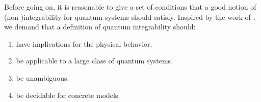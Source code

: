 \documentclass[a4paper,12pt,listof=totoc,index=totoc,bibliography=totoc,headsepline=false,headings=normal,BCOR16.153846mm,DIV12,headinclude,twoside,cleardoublepage=empty,numbers=noenddot,final]{scrreprt}
\theoremstyle{mystyle}
\numberwithin{equation}{section}
\numberwithin{figure}{section}
\numberwithin{lemma}{section}
\numberwithin{theorem}{section}
\numberwithin{corollary}{section}
\numberwithin{definition}{section}
\numberwithin{conjecture}{section}
\numberwithin{observation}{section}
\newcommand{\+}{\mkern2mu}
\DeclareMathOperator{\1}{\mathds{1}}
\begin{document}
Before going on, it is reasonable to give a set of conditions that a good notion of \mbox{(non-)}integrability for quantum systems should satisfy.
Inspired by the work of \textcite{1012.3587v1}, we demand that a definition of quantum integrability should:
\begin{enumerate}[label={(Condition~\arabic*)},ref={\arabic*},leftmargin=*]
\item \label{item:reasonablenotionofquantumintegrabilitycondition4} have implications for the physical behavior.
\item \label{item:reasonablenotionofquantumintegrabilitycondition1} be applicable to a large class of quantum systems.
\item \label{item:reasonablenotionofquantumintegrabilitycondition2} be unambiguous.
\item \label{item:reasonablenotionofquantumintegrabilitycondition3} be decidable for concrete models.
\end{enumerate}
\end{document}
